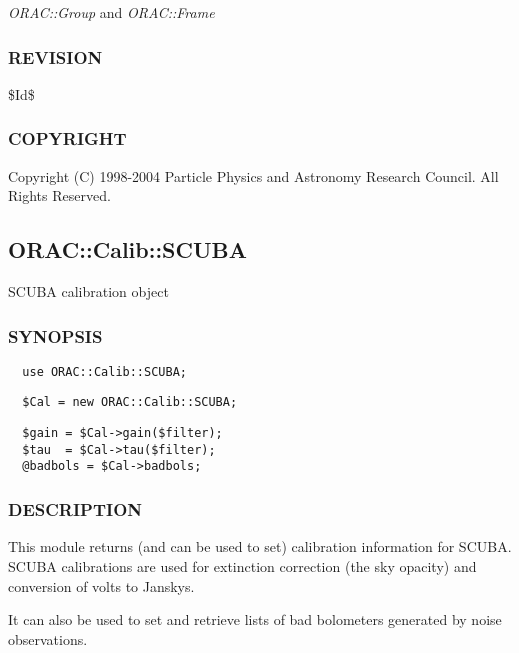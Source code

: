 \emph{ORAC::Group} and
\emph{ORAC::Frame}

\subsubsection*{REVISION\label{ORAC::Calib_REVISION}}


\$Id\$

\subsubsection*{COPYRIGHT\label{ORAC::Calib_COPYRIGHT}}


Copyright (C) 1998-2004 Particle Physics and Astronomy Research
Council. All Rights Reserved.

\subsection{ORAC::Calib::SCUBA\label{ORAC::Calib::SCUBA}}


SCUBA calibration object

\subsubsection*{SYNOPSIS\label{ORAC::Calib::SCUBA_SYNOPSIS}}
\begin{verbatim}
  use ORAC::Calib::SCUBA;
\end{verbatim}
\begin{verbatim}
  $Cal = new ORAC::Calib::SCUBA;
\end{verbatim}
\begin{verbatim}
  $gain = $Cal->gain($filter);
  $tau  = $Cal->tau($filter);
  @badbols = $Cal->badbols;
\end{verbatim}
\subsubsection*{DESCRIPTION\label{ORAC::Calib::SCUBA_DESCRIPTION}}


This module returns (and can be used to set) calibration information
for SCUBA. SCUBA calibrations are used for extinction correction
(the sky opacity) and conversion of volts to Janskys.



It can also be used to set and retrieve lists of bad bolometers generated
by noise observations.



